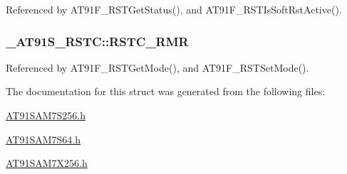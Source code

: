 Referenced by AT91F\_\-RSTGetStatus(), and AT91F\_\-RSTIsSoftRstActive().\hypertarget{struct__AT91S__RSTC_94062b99900bea54ab1e8d7bb1295416}{
\subsubsection{ {\bf \_\-AT91S\_\-RSTC::RSTC\_\-RMR}}}
\label{struct__AT91S__RSTC_94062b99900bea54ab1e8d7bb1295416}




Referenced by AT91F\_\-RSTGetMode(), and AT91F\_\-RSTSetMode().

The documentation for this struct was generated from the following files:\begin{CompactItemize}
\item 
\hyperlink{AT91SAM7S256_8h}{AT91SAM7S256.h}\item 
\hyperlink{AT91SAM7S64_8h}{AT91SAM7S64.h}\item 
\hyperlink{AT91SAM7X256_8h}{AT91SAM7X256.h}\end{CompactItemize}
